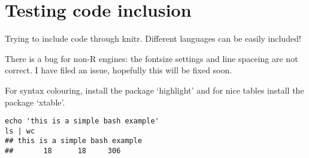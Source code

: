 \documentclass[output=inprep,
		biblatex
		]{LSP/langsci}\usepackage[]{graphicx}\usepackage[]{color}
\makeatletter
\newenvironment{kframe}{%
 \def\at@end@of@kframe{}%
 \ifinner\ifhmode%
  \def\at@end@of@kframe{\end{minipage}}%
  \begin{minipage}{\columnwidth}%
 \fi\fi%
 \def\FrameCommand##1{\hskip\@totalleftmargin \hskip-\fboxsep
 \colorbox{shadecolor}{##1}\hskip-\fboxsep
     \hskip-\linewidth \hskip-\@totalleftmargin \hskip\columnwidth}%
 \MakeFramed {\advance\hsize-\width
   \@totalleftmargin\z@ \linewidth\hsize
   \@setminipage}}%
 {\par\unskip\endMakeFramed%
 \at@end@of@kframe}
\newenvironment{knitrout}{}{} %
\makeatother
\begin{document}
\maketitle
\frontmatter
% 
% 
% 
\tableofcontents
\mainmatter%















\chapter{Testing code inclusion}


Trying to include code through knitr. 
Different languages can be easily 
included!

There is a bug for non-R engines: the fontsize settings and line spaceing are not correct. I have 
filed an issue, hopefully this will be fixed soon. 

For syntax colouring, install the package `highlight' and for nice tables 
install the package `xtable'.

\begin{knitrout}\scriptsize
{}\color{fgcolor}\begin{kframe}
\begin{verbatim}
echo 'this is a simple bash example'
ls | wc
## this is a simple bash example
##       18      18     306
\end{verbatim}
\end{kframe}
\end{knitrout}
\end{document}
